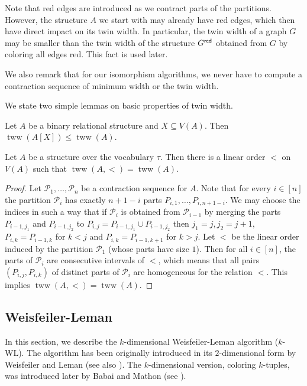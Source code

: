 \documentclass{theoretics}
\newcommand{\CP}{{\mathcal P}}
\newcommand{\red}{{\sf red}}
\DeclareMathOperator{\tww}{tww}
\begin{document}
Note that red edges are introduced as we contract parts of the partitions.
However, the structure $A$ we start with may already have red edges, which then have direct impact on its twin width.
In particular, the twin width of a graph $G$ may be smaller than the twin width of the structure $G^{\red}$ obtained from $G$ by coloring all edges red.
This fact is used later.

We also remark that for our isomorphism algorithms, we never have to compute a contraction sequence of minimum width or the twin width.

We state two simple lemmas on basic properties of twin width.

\begin{lemma}
 \label{lem:tww-hereditary}
 Let ${A}$ be a binary relational structure and $X \subseteq V({A})$.
 Then $\tww({A}[X]) \leq \tww({A})$.
\end{lemma}

\begin{lemma}
 \label{lem:twin-width-order}
 Let ${A}$ be a structure over the vocabulary $\tau$.
 Then there is a linear order $<$ on $V({A})$ such that $\tww({A},<) = \tww({A})$.
\end{lemma}

\begin{proof}
 Let $\CP_1,\dots,\CP_n$ be a contraction sequence for ${A}$.
 Note that for every $i \in [n]$ the partition $\CP_i$ has exactly $n+1-i$ parts $P_{i,1},\dots,P_{i,n+1-i}$.
 We may choose the indices in such a way that if $\CP_{i}$ is obtained from $\CP_{i-1}$ by merging the parts $P_{i-1,j_1}$ and $P_{i-1,j_2}$ to $P_{i,j}=P_{i-1,j_1}\cup P_{i-1,j_2}$ then $j_1=j,j_2=j+1$, $P_{i,k}=P_{i-1,k}$ for $k<j$ and $P_{i,k}=P_{i-1,k+1}$ for $k>j$.
 Let $<$ be the linear order induced by the partition $\CP_1$ (whose parts have size $1$).
 Then for all $i \in [n]$, the parts of $\CP_i$ are consecutive intervals of $<$, which means that all pairs $(P_{i,j},P_{i,k})$ of distinct parts of $\CP_i$ are homogeneous for the relation $<$.
 This implies $\tww({A},<) = \tww({A})$.
\end{proof}


\subsection{Weisfeiler-Leman}
\label{sec:wl-def}

In this section, we describe the $k$-dimensional Weisfeiler-Leman algorithm ($k$-WL).
The algorithm has been originally introduced in its $2$-dimensional form by Weisfeiler and Leman \cite{WeisfeilerL68} (see also \cite{Weisfeiler76}).
The $k$-dimensional version, coloring $k$\nobreakdash-tuples, was introduced later by Babai and Mathon (see \cite{CaiFI92}).
\end{document}
